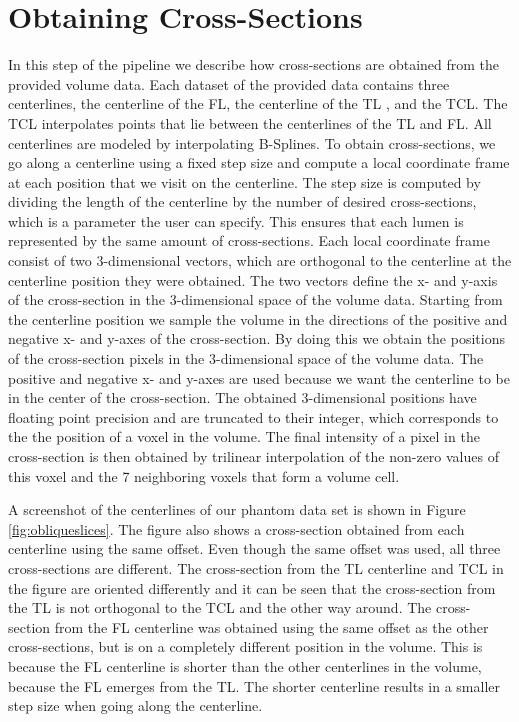 \documentclass[thesis.tex]{subfiles}
\begin{document}
\section{Obtaining Cross-Sections}
In this step of the pipeline we describe how cross-sections are obtained from the provided volume data. Each dataset of the provided data contains three centerlines, the centerline of the FL, the centerline of the TL , and the TCL. The TCL interpolates points that lie between the centerlines of the TL and FL. All centerlines are modeled by interpolating B-Splines. To obtain cross-sections, we go along a centerline using a fixed step size and compute a local coordinate frame at each position that we visit on the centerline. The step size is computed by dividing the length of the centerline by the number of desired cross-sections, which is a parameter the user can specify. This ensures that each lumen is represented by the same amount of cross-sections. Each local coordinate frame consist of two 3-dimensional vectors, which are orthogonal to the centerline at the centerline position they were obtained. The two vectors define the x- and y-axis of the cross-section in the 3-dimensional space of the volume data. Starting from the centerline position we sample the volume in the directions of the positive and negative x- and y-axes of the cross-section. By doing this we obtain the positions of the cross-section pixels in the 3-dimensional space of the volume data. The positive and negative x- and y-axes are used because we want the centerline to be in the center of the cross-section. The obtained 3-dimensional positions have floating point precision and are truncated to their integer, which corresponds to the the position of a voxel in the volume. The final intensity of a pixel in the cross-section is then obtained by trilinear interpolation of the non-zero values of this voxel and the 7 neighboring voxels that form a volume cell.  

A screenshot of the centerlines of our phantom data set is shown in Figure \ref{fig:obliqueslices}. The figure also shows a cross-section obtained from each centerline using the same offset. Even though the same offset was used, all three cross-sections are different. The cross-section from the TL centerline and TCL in the figure are oriented differently and it can be seen that the cross-section from the TL is not orthogonal to the TCL and the other way around. The  cross-section from the FL centerline was obtained using the same offset as the other cross-sections, but is on a completely different position in the volume. This is because the FL centerline is shorter than the other centerlines in the volume, because the FL emerges from the TL. The shorter centerline results in a smaller step size when going along the centerline. 
\end{document}
